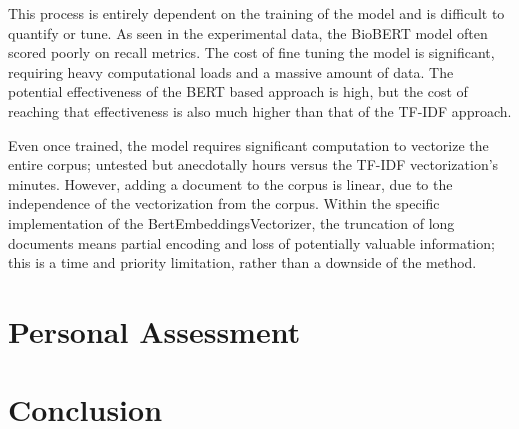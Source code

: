 \documentclass[11pt]{article} %
\theoremstyle{plain}
\theoremstyle{definition}
\begin{document}
This process is entirely dependent on the training of the model and is difficult to quantify or tune. As seen in the experimental data, the BioBERT model often scored poorly on recall metrics. The cost of fine tuning the model is significant, requiring heavy computational loads and a massive amount of data. The potential effectiveness of the BERT based approach is high, but the cost of reaching that effectiveness is also much higher than that of the TF-IDF approach.

Even once trained, the model requires significant computation to vectorize the entire corpus; untested but anecdotally hours versus the TF-IDF vectorization's minutes. However, adding a document to the corpus is linear, due to the independence of the vectorization from the corpus. Within the specific implementation of the BertEmbeddingsVectorizer, the truncation of long documents means partial encoding and loss of potentially valuable information; this is a time and priority limitation, rather than a downside of the method.

\section{Personal Assessment}

\section{Conclusion}



\end{document}

